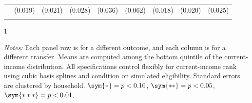 \begin{table}[H]
\begin{tabular*}{1.36\textwidth}{@{\extracolsep{\fill}}lcccccccc}
 & (0.019)         &
(0.021)         & (0.028)
& (0.036)         & (0.062)
& (0.018)         &
(0.020)         & (0.025)
\\ \addlinespace
\bottomrule
\end{tabular*}
\begin{spacing}{1}
    \begin{tablenotes}
          \item \footnotesize \textit{Notes:} Each panel row is for a different
            outcome, and each column is for a different
            transfer. Means are computed among the bottom quintile of the
            current-income distribution. All specifications
            control flexibly for current-income rank using cubic basis
            splines and condition on simulated eligibility. Standard errors are clustered by
            household. $\sym{*} = p < 0.10$, $\sym{**} = p < 0.05$,
            $\sym{***} = p < 0.01$.            
          \end{tablenotes}
           \end{spacing}
          \end{table}